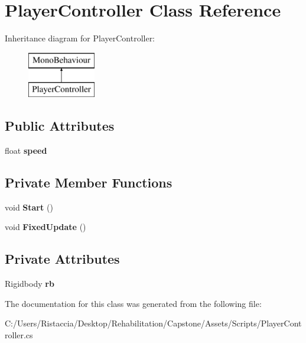\hypertarget{class_player_controller}{}\section{Player\+Controller Class Reference}
\label{class_player_controller}
Inheritance diagram for Player\+Controller\+:\begin{figure}[H]
\begin{center}
\leavevmode
\includegraphics[height=2.000000cm]{class_player_controller}
\end{center}
\end{figure}
\subsection*{Public Attributes}
\begin{DoxyCompactItemize}
\item 
\mbox{\label{class_player_controller_a0928605583f0563cd84fe43119d336ec}} 
float {\bfseries speed}
\end{DoxyCompactItemize}
\subsection*{Private Member Functions}
\begin{DoxyCompactItemize}
\item 
\mbox{\label{class_player_controller_ae1117d9c4da3193181cddad2c814e467}} 
void {\bfseries Start} ()
\item 
\mbox{\label{class_player_controller_ae5bdb1b48571f67c3f722a58b6f404d4}} 
void {\bfseries Fixed\+Update} ()
\end{DoxyCompactItemize}
\subsection*{Private Attributes}
\begin{DoxyCompactItemize}
\item 
\mbox{\label{class_player_controller_a93b9fa76e5456725594e87dd40f93611}} 
Rigidbody {\bfseries rb}
\end{DoxyCompactItemize}


The documentation for this class was generated from the following file\+:\begin{DoxyCompactItemize}
\item 
C\+:/\+Users/\+Ristaccia/\+Desktop/\+Rehabilitation/\+Capstone/\+Assets/\+Scripts/Player\+Controller.\+cs\end{DoxyCompactItemize}
